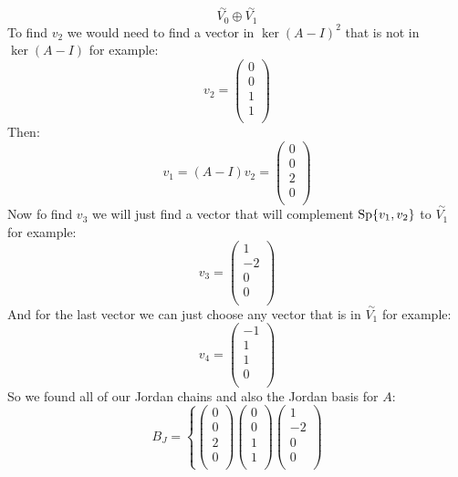 \documentclass[11pt, a4paper]{article}
\begin{document}
\begin{solution}
\[    \overset{\sim}{V_0} \oplus \overset{\sim}{V_1}
  \]
  To find $v_2$ we would need to find a vector in $\ker(A-I)^2$ that
  is not in $\ker(A-I)$ for example:
  \[
    v_2 = \begin{pmatrix} 0\\ 0\\ 1\\ 1\\ \end{pmatrix}
  \]
  Then:
  \[
    v_1 = (A-I)v_2 = \begin{pmatrix} 0\\ 0\\ 2\\ 0\\ \end{pmatrix}
  \]
  Now fo find $v_3$ we will just find a vector that will complement 
  $\mathrm{Sp}\{v_1,v_2\}$ to $\overset{\sim}{V_1}$ for example:
  \[
    v_3 = \begin{pmatrix} 1\\ -2\\ 0\\ 0\\ \end{pmatrix}
  \]
  And for the last vector we can just choose any vector that is in 
  $\overset{\sim}{V_1}$ for example:
  \[
    v_4 = \begin{pmatrix} -1\\ 1\\ 1\\ 0\\ \end{pmatrix}
  \]
  So we found all of our Jordan chains and also the Jordan basis for $A$:
  \[
    B_J = 
    \left\{
    \begin{pmatrix} 0\\ 0\\ 2\\ 0\\ \end{pmatrix}
    \begin{pmatrix} 0\\ 0\\ 1\\ 1\\ \end{pmatrix}
    \begin{pmatrix} 1\\ -2\\ 0\\ 0\\ \end{pmatrix}
\]
\end{solution}
\end{document}
